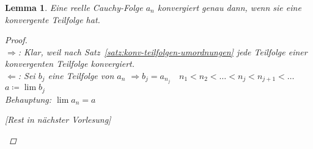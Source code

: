 \documentclass[11pt, twoside, a4paper]{article}
\theoremstyle{plain}
\newtheorem{lemma}[blockelement]{Lemma}
\newcommand{\impl}[0]{\Rightarrow{}}
\newcommand{\definedas}[0]{\coloneqq}
\newcommand{\anf}[1]{\glqq{}#1\grqq}
\begin{document}
    \begin{lemma} %
        Eine reelle Cauchy-Folge $a_n$ konvergiert genau dann, wenn sie eine konvergente Teilfolge hat.

        \begin{proof}
            ~\\
            \anf{$\impl$}: Klar, weil nach Satz~\ref{satz:konv-teilfolgen-umordnungen} jede Teilfolge einer konvergenten Teilfolge konvergiert.\\
            \anf{$\Leftarrow$}: Sei $b_j$ eine Teilfolge von $a_n$
            $\impl b_j = a_{n_j}\quad n_1 < n_2 < \dots < n_j < n_{j+1} < \dots$\\
            $a\definedas \lim b_j$\\
            Behauptung: $\lim a_n = a$
            \begin{center}
            [Rest in nächster Vorlesung]
            \end{center}
        \end{proof}
    \end{lemma}
\end{document}
